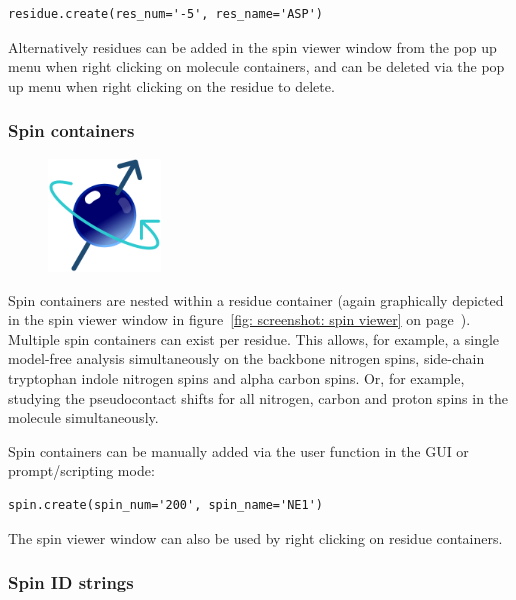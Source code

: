 \begin{lstlisting}
residue.create(res_num='-5', res_name='ASP')
\end{lstlisting}

Alternatively residues can be added in the spin viewer window from the pop up menu when right clicking on molecule containers, and can be deleted via the pop up menu when right clicking on the residue to delete.



\newpage
\subsubsection{Spin containers}

\begin{figure}[h]
\includegraphics[width=3cm, bb=0 0 1701 1701]{graphics/misc/spin_600x600}
\end{figure}

Spin containers are nested within a residue container (again graphically depicted in the spin viewer window in figure~\ref{fig: screenshot: spin viewer} on page~\pageref{fig: screenshot: spin viewer}).  Multiple spin containers can exist per residue.  This allows, for example, a single model-free analysis simultaneously on the backbone nitrogen spins, side-chain tryptophan indole nitrogen spins and alpha carbon spins.  Or, for example, studying the pseudocontact shifts for all nitrogen, carbon and proton spins in the molecule simultaneously.

Spin containers can be manually added via the  user function in the GUI or prompt/scripting mode:

\begin{lstlisting}
spin.create(spin_num='200', spin_name='NE1')
\end{lstlisting}

The spin viewer window can also be used by right clicking on residue containers.



\subsubsection{Spin ID strings} \label{sect: spin ID}

